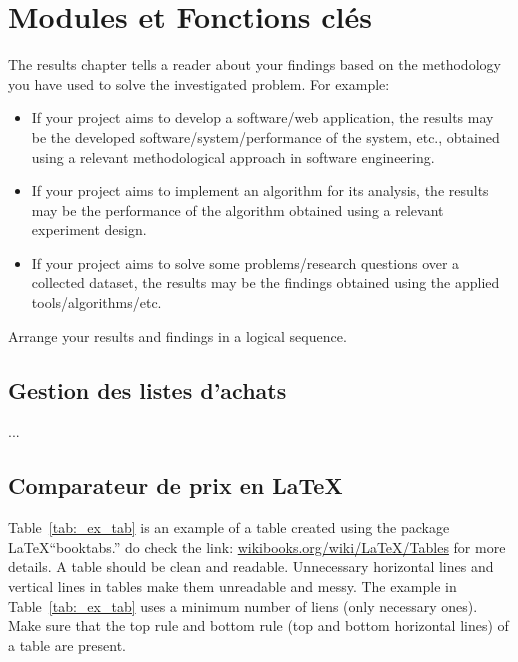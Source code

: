 \chapter{Modules et Fonctions clés}
\label{ch:results}
The results chapter tells a reader about your findings based on the methodology you have used to solve the investigated problem. For example: 
\begin{itemize}
    \item If your project aims to develop a software/web application, the results may be the developed software/system/performance of the system, etc., obtained using a relevant methodological approach in software engineering. 
    
    \item If your project aims to implement an algorithm for its analysis, the results may be the performance of the algorithm obtained using a relevant experiment design. 
    
    \item If your project aims to solve some problems/research questions over a collected dataset, the results may be the findings obtained using the applied tools/algorithms/etc. 
\end{itemize}
Arrange your results and findings in a logical sequence. 



\section{Gestion des listes d’achats}

...

\clearpage
\section{Comparateur de prix en \LaTeX}
Table~\ref{tab:_ex_tab} is an example of a table created using the package \LaTeX  ``booktabs.'' do check the link: \href{https://en.wikibooks.org/wiki/LaTeX/Tables}{wikibooks.org/wiki/LaTeX/Tables} for more details. A table should be clean and readable. Unnecessary horizontal lines and vertical lines in tables make them unreadable and messy. The example in Table~\ref{tab:_ex_tab} uses a minimum number of liens (only necessary ones). Make sure that the top rule and bottom rule (top and bottom horizontal lines) of a table are present. 

